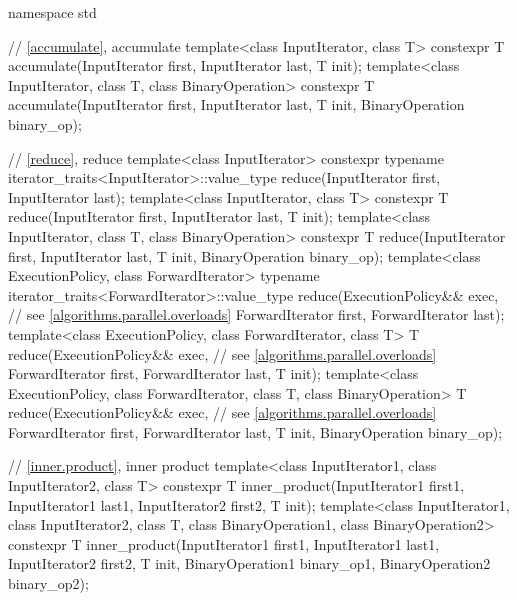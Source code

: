 %
\begin{codeblock}
namespace std {
  // \ref{accumulate}, accumulate
  template<class InputIterator, class T>
    constexpr T accumulate(InputIterator first, InputIterator last, T init);
  template<class InputIterator, class T, class BinaryOperation>
    constexpr T accumulate(InputIterator first, InputIterator last, T init,
                           BinaryOperation binary_op);

  // \ref{reduce}, reduce
  template<class InputIterator>
    constexpr typename iterator_traits<InputIterator>::value_type
      reduce(InputIterator first, InputIterator last);
  template<class InputIterator, class T>
    constexpr T reduce(InputIterator first, InputIterator last, T init);
  template<class InputIterator, class T, class BinaryOperation>
    constexpr T reduce(InputIterator first, InputIterator last, T init,
                       BinaryOperation binary_op);
  template<class ExecutionPolicy, class ForwardIterator>
    typename iterator_traits<ForwardIterator>::value_type
      reduce(ExecutionPolicy&& exec,                            // see \ref{algorithms.parallel.overloads}
             ForwardIterator first, ForwardIterator last);
  template<class ExecutionPolicy, class ForwardIterator, class T>
    T reduce(ExecutionPolicy&& exec,                            // see \ref{algorithms.parallel.overloads}
             ForwardIterator first, ForwardIterator last, T init);
  template<class ExecutionPolicy, class ForwardIterator, class T, class BinaryOperation>
    T reduce(ExecutionPolicy&& exec,                            // see \ref{algorithms.parallel.overloads}
             ForwardIterator first, ForwardIterator last, T init, BinaryOperation binary_op);

  // \ref{inner.product}, inner product
  template<class InputIterator1, class InputIterator2, class T>
    constexpr T inner_product(InputIterator1 first1, InputIterator1 last1,
                              InputIterator2 first2, T init);
  template<class InputIterator1, class InputIterator2, class T,
           class BinaryOperation1, class BinaryOperation2>
    constexpr T inner_product(InputIterator1 first1, InputIterator1 last1,
                              InputIterator2 first2, T init,
                              BinaryOperation1 binary_op1, BinaryOperation2 binary_op2);

}
\end{codeblock}
